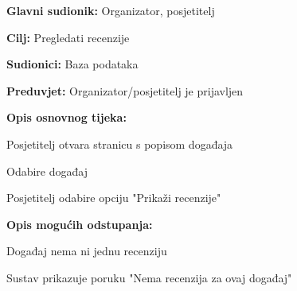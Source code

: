 					\noindent {}
					\begin{packed_item}
	
						\item \textbf{Glavni sudionik:} Organizator, posjetitelj
						\item  \textbf{Cilj:} Pregledati recenzije
						\item  \textbf{Sudionici:} Baza podataka
						\item  \textbf{Preduvjet:} Organizator/posjetitelj je prijavljen
						\item  \textbf{Opis osnovnog tijeka:}
						
						\item[] \begin{packed_enum}
	
							\item Posjetitelj otvara stranicu s popisom događaja
							\item Odabire događaj
							\item Posjetitelj odabire opciju "Prikaži recenzije"

						\end{packed_enum}
						
						\item  \textbf{Opis mogućih odstupanja:}
						
						\item[] \begin{packed_item}
	
							\item[3.a] Događaj nema ni jednu recenziju
							\begin{packed_enum}
								\item Sustav prikazuje poruku "Nema recenzija za ovaj događaj"
							\end{packed_enum}
							
						\end{packed_item}
					\end{packed_item}


